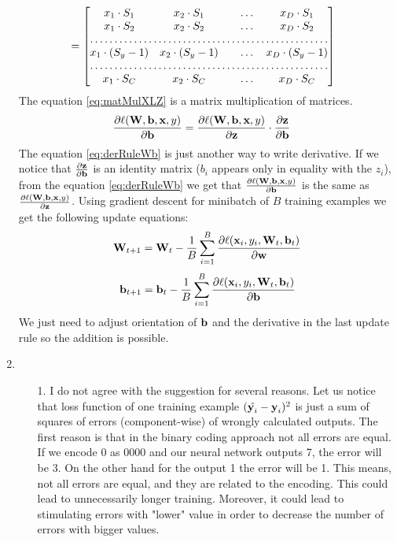 \documentclass[10pt,a4paper]{article}
\begin{document}
\begin{enumerate}
\begin{align}
&=\begin{bmatrix}
    x_1 \cdot S_1   & 
x_2 \cdot S_1      &  & \dots  & x_D\cdot S_1 \\
 x_1 \cdot S_2    & 
x_2 \cdot S_2 &  & \dots & x_D \cdot S_2 \\
    \hdotsfor{5} \\
     x_1 \cdot (S_y -1)    & 
x_2 \cdot (S_y -1) &  & \dots & x_D \cdot (S_y -1) \\
    \hdotsfor{5} \\
        x_1 \cdot S_C    & 
x_2 \cdot S_C &     &  \dots& x_D \cdot  S_C \\
\end{bmatrix}\label{eq:matMulXLZ}
\end{align}
The equation \ref{eq:matMulXLZ} is a matrix multiplication of matrices. 
\begin{align}
\frac{\partial \ell(\textbf{\text{{W}}}, \textbf{\text{{b}}}, \textbf{\text{{x}}}, y)}{\partial \textbf{\text{{b}}}} &=
\frac{\partial \ell (\textbf{\text{{W}}}, \textbf{\text{{b}}}, \textbf{\text{{x}}}, y)}{\partial \textbf{\text{{z}}}}
\cdot \frac{\partial \textbf{\text{{z}}}}{\partial \textbf{\text{{b}}}} \label{eq:derRuleWb}
\end{align}
The equation \ref{eq:derRuleWb} is just another way to write derivative. 
If we notice that $\frac{\partial \textbf{\text{{z}}}}{\partial \textbf{\text{{b}}}}$ is an identity matrix ($b_i$ appears only in equality with the $z_i$), from the equation \ref{eq:derRuleWb} we get that $\frac{\partial \ell(\textbf{\text{{W}}}, \textbf{\text{{b}}}, \textbf{\text{{x}}}, y)}{\partial \textbf{\text{{b}}}}$ is the same as $\frac{\partial \ell(\textbf{\text{{W}}}, \textbf{\text{{b}}}, \textbf{\text{{x}}}, y)}{\partial \textbf{\text{{z}}}}$.
Using gradient descent for minibatch of $B$ training examples we get the following update equations:
$$\textbf{\text{{W}}}_{t+1} = \textbf{\text{{W}}}_t - \frac{1}{B}\sum_{i=1}^B\frac{\partial \ell(\textbf{\text{{x}}}_i, y_i, \textbf{\text{{W}}}_t, \textbf{\text{{b}}}_t)}{\partial \textbf{\text{{w}}}}$$
$$\textbf{\text{{b}}}_{t+1} = \textbf{\text{{b}}}_t - \frac{1}{B}\sum_{i=1}^B\frac{\partial \ell(\textbf{\text{{x}}}_i, y_i, \textbf{\text{{W}}}_t, \textbf{\text{{b}}}_t)}{\partial \textbf{\text{{b}}}}$$
We just need to adjust orientation of $\textbf{\text{{b}}}$ and the derivative in the last update rule so the addition is possible. 
\item 
\begin{enumerate}
\item [1.]
I do not agree with the suggestion for several reasons. Let us notice that loss function of one training example $(\hat{\textbf{\text{{y}}}_i}-\textbf{\text{{y}}}_i)^2$ is just a sum of squares of errors (component-wise) of wrongly calculated outputs. The first reason is that in the binary coding approach not all errors are equal. If we encode 0 as 0000 and our neural network outputs 7, the error will be 3. On the other hand for the output 1 the error will be 1. This means, not all errors are equal, and they are related to the encoding. This could lead to unnecessarily longer training. Moreover, it could lead to stimulating errors with "lower" value in order to decrease the number of errors with bigger values.\\

\end{enumerate}
\end{enumerate}
\end{document}
